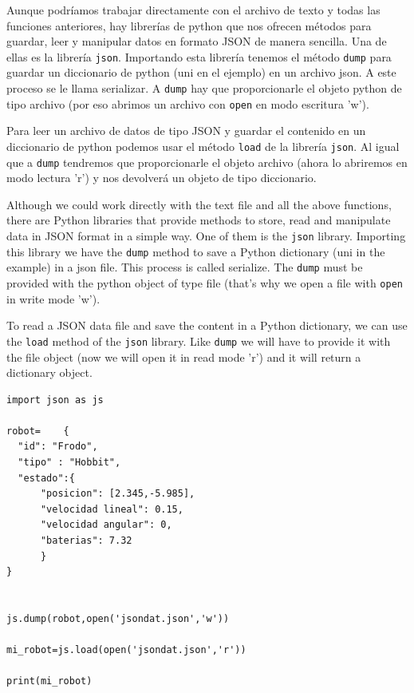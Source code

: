 \begin{paracol}{2}
    Aunque podríamos trabajar directamente con el archivo de texto y todas las funciones anteriores, hay librerías de python que nos ofrecen métodos para guardar, leer y manipular datos en formato JSON de manera sencilla. Una de ellas es la librería \texttt{json}. Importando esta librería tenemos el método \texttt{dump} para guardar un diccionario de python (uni en el ejemplo) en un archivo json. A este proceso se le llama serializar. A \texttt{dump} hay que proporcionarle el objeto python de tipo archivo (por eso abrimos un archivo con \texttt{open} en modo escritura 'w').

    Para leer un archivo de datos de tipo JSON y guardar el contenido en un diccionario de python podemos usar el método \texttt{load} de la librería \texttt{json}. Al igual que a \texttt{dump} tendremos que proporcionarle el objeto archivo (ahora lo abriremos en modo lectura 'r') y nos devolverá un objeto de tipo diccionario.
    
\switchcolumn
    Although we could work directly with the text file and all the above functions, there are Python libraries that provide methods to store, read and manipulate data in JSON format in a simple way. One of them is the \texttt{json} library. Importing this library we have the \texttt{dump} method to save a Python dictionary (uni in the example) in a json file. This process is called serialize. The \texttt{dump} must be provided with the python object of type file (that's why we open a file with \texttt{open} in write mode 'w').

    To read a JSON data file and save the content in a Python dictionary, we can use the \texttt{load} method of the \texttt{json} library. Like \texttt{dump} we will have to provide it with the file object (now we will open it in read mode 'r') and it will return a dictionary object.

\switchcolumn


\end{paracol}

\begin{verbatim}
import json as js

robot=    {
  "id": "Frodo",
  "tipo" : "Hobbit",    
  "estado":{
      "posicion": [2.345,-5.985],
      "velocidad lineal": 0.15,
      "velocidad angular": 0,
      "baterias": 7.32
      }
}


js.dump(robot,open('jsondat.json','w'))

mi_robot=js.load(open('jsondat.json','r'))

print(mi_robot)
\end{verbatim}

